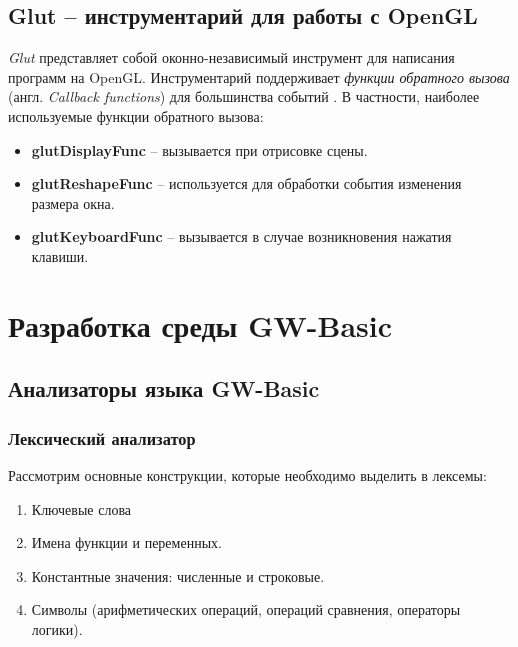 \documentclass[12pt]{article}
\begin{document}
		\subsection{Glut -- инструментарий для работы с OpenGL}
		\hspace{\parindent} {\it Glut} представляет собой оконно-независимый инструмент для написания программ на OpenGL. Инструментарий поддерживает {\it функции обратного вызова} (англ. {\it Callback functions}) для большинства событий \cite{glutCallbacks}. В частности, наиболее используемые функции обратного вызова:
		\begin{itemize}
			\item {\bf glutDisplayFunc} -- вызывается при отрисовке сцены.
			\item {\bf glutReshapeFunc} -- используется для обработки события изменения размера окна.
			\item {\bf glutKeyboardFunc} -- вызывается в случае возникновения нажатия клавиши.
		\end{itemize}
		
	\newpage
	\section{Разработка среды GW-Basic}
		\subsection{Анализаторы языка GW-Basic}
			\subsubsection{Лексический анализатор}
			\label{subsec:lexAnalyzer}
				\hspace{\parindent} Рассмотрим основные конструкции, которые необходимо выделить в лексемы:
				\begin{enumerate}
					\item Ключевые слова
					\item Имена функции и переменных.
					\item Константные значения: численные и строковые.
					\item Символы (арифметических операций, операций сравнения, операторы логики).
				\end{enumerate}
				
\end{document}
